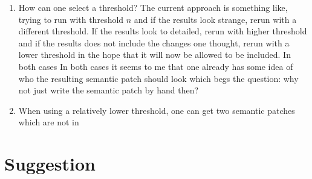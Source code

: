 \documentclass{article}
\begin{document}
\begin{enumerate}
\item How can one select a threshold? The current approach is
  something like, trying to run  with threshold $n$ and if
  the results look strange, rerun  with a different
  threshold. If the results look to detailed, rerun with higher
  threshold and if the results does not include the changes one
  thought, rerun with a lower threshold in the hope that it will now
  be allowed to be included. In both cases In both cases it seems to
  me that one already has some idea of who the resulting semantic
  patch should look which begs the question: why not just write the
  semantic patch by hand then?
\item When using a relatively lower threshold, one can get two
  semantic patches which are not in 
\end{enumerate}

\section{Suggestion}

\end{document}
